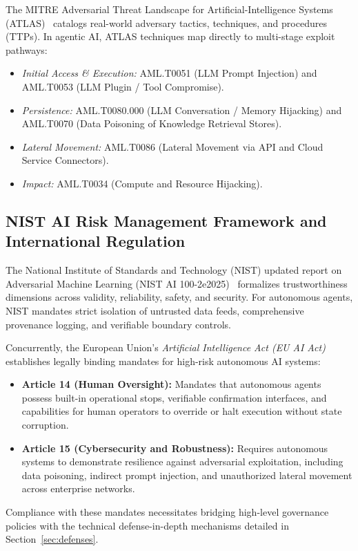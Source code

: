 The MITRE Adversarial Threat Landscape for Artificial-Intelligence Systems (ATLAS)~\cite{mitre2026atlas} catalogs real-world adversary tactics, techniques, and procedures (TTPs). In agentic AI, ATLAS techniques map directly to multi-stage exploit pathways:
\begin{itemize}
    \item \textit{Initial Access \& Execution:} AML.T0051 (LLM Prompt Injection) and AML.T0053 (LLM Plugin / Tool Compromise).
    \item \textit{Persistence:} AML.T0080.000 (LLM Conversation / Memory Hijacking) and AML.T0070 (Data Poisoning of Knowledge Retrieval Stores).
    \item \textit{Lateral Movement:} AML.T0086 (Lateral Movement via API and Cloud Service Connectors).
    \item \textit{Impact:} AML.T0034 (Compute and Resource Hijacking).
\end{itemize}

\subsection{NIST AI Risk Management Framework and International Regulation}
\label{subsec:nist_eu_act}

The National Institute of Standards and Technology (NIST) updated report on Adversarial Machine Learning (NIST AI 100-2e2025)~\cite{vassilev2025adversarial} formalizes trustworthiness dimensions across validity, reliability, safety, and security. For autonomous agents, NIST mandates strict isolation of untrusted data feeds, comprehensive provenance logging, and verifiable boundary controls.

Concurrently, the European Union's \textit{Artificial Intelligence Act (EU AI Act)} establishes legally binding mandates for high-risk autonomous AI systems:
\begin{itemize}
    \item \textbf{Article 14 (Human Oversight):} Mandates that autonomous agents possess built-in operational stops, verifiable confirmation interfaces, and capabilities for human operators to override or halt execution without state corruption.
    \item \textbf{Article 15 (Cybersecurity and Robustness):} Requires autonomous systems to demonstrate resilience against adversarial exploitation, including data poisoning, indirect prompt injection, and unauthorized lateral movement across enterprise networks.
\end{itemize}
Compliance with these mandates necessitates bridging high-level governance policies with the technical defense-in-depth mechanisms detailed in Section~\ref{sec:defenses}.
